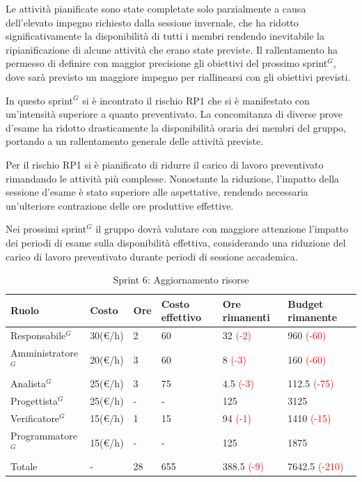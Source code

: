 Le attività pianificate sono state completate solo parzialmente a causa dell'elevato impegno richiesto dalla sessione invernale, che ha ridotto significativamente la disponibilità di tutti i membri rendendo inevitabile la ripianificazione di alcune attività che erano state previste.
Il rallentamento ha permesso di definire con maggior precisione gli obiettivi del prossimo sprint$^G$, dove sarà previsto un maggiore impegno per riallinearsi con gli obiettivi previsti.

In questo sprint$^G$ si è incontrato il rischio RP1 che si è manifestato con un'intensità superiore a quanto preventivato. 
La concomitanza di diverse prove d'esame ha ridotto drasticamente la disponibilità oraria dei membri del gruppo, portando a un rallentamento generale delle attività previste.

Per il rischio RP1 si è pianificato di ridurre il carico di lavoro preventivato rimandando le attività più complesse. 
Nonostante la riduzione, l'impatto della sessione d'esame è stato superiore alle aspettative, rendendo necessaria un'ulteriore contrazione delle ore produttive effettive. 

Nei prossimi sprint$^G$ il gruppo dovrà valutare con maggiore attenzione l'impatto dei periodi di esame sulla disponibilità effettiva, considerando una riduzione del carico di lavoro preventivato durante periodi di sessione accademica.

\begin{table}[H]
	\centering
	\begin{tabular}{|p{}|p{}|p{}|p{}|p{}|p{}|}
		\hline
		\rowcolor{gray!25}
		Ruolo & Costo & Ore & Costo \newline effettivo & Ore \newline rimanenti & Budget \newline rimanente \\ \hline
		Responsabile$^G$       & 30(€/h) & 2 & 60 & 32 \textcolor{red}{(-2)} & 960 \textcolor{red}{(-60)} \\ \hline
		Amministratore$^G$ & 20(€/h) & 3 & 60 & 8 \textcolor{red}{(-3)} & 160 \textcolor{red}{(-60)} \\ \hline
		Analista$^G$       & 25(€/h) & 3 & 75 & 4.5 \textcolor{red}{(-3)} & 112.5 \textcolor{red}{(-75)}\\ \hline
		Progettista$^G$    & 25(€/h) & - & - & 125 & 3125 \\ \hline
		Verificatore$^G$   & 15(€/h) & 1 & 15 & 94 \textcolor{red}{(-1)} & 1410 \textcolor{red}{(-15)} \\ \hline
		Programmatore$^G$  & 15(€/h) & - & - & 125 & 1875 \\ \hline
		Totale         & - & 28 & 655 & 388.5 \textcolor{red}{(-9)} & 7642.5 \textcolor{red}{(-210)}\\ \hline
	\end{tabular}
	\caption{Sprint 6: Aggiornamento risorse}
\end{table}